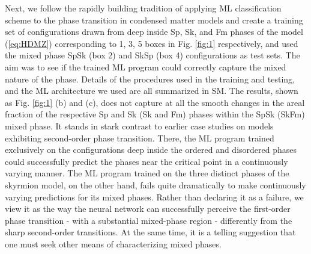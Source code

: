 \documentclass[reprint,amsmath,amssymb,aps,showpacs,superscriptaddress,prl]{revtex4-1}
\begin{document}
Next, we follow the rapidly building tradition of applying ML classification scheme to the phase transition in condensed matter models and create a training set of configurations drawn from deep inside Sp, Sk, and Fm phases of the model (\ref{eq:HDMZ}) corresponding to 1, 3, 5 boxes in Fig. \ref{fig:1} respectively, and used the mixed phase SpSk (box 2) and SkSp (box 4) configurations as test sets. The aim was to see if the trained ML program could correctly capture the mixed nature of the phase. Details of the procedures used in the training and testing, and the ML architecture we used are all summarized in SM. The results, shown as Fig. \ref{fig:1} (b) and (c), does not capture at all the smooth changes in the areal fraction of the respective Sp and Sk (Sk and Fm) phases within the SpSk (SkFm) mixed phase.
It stands in stark contrast to earlier case studies on models exhibiting second-order phase transition. There, the ML program trained exclusively on the configurations deep inside the ordered and disordered phases could successfully predict the phases near the critical point in a continuously varying manner\cite{wang16,melko17,tanaka17,scalettar17,wetzel17,kim18,zhai17,scalettar17,beach18}. The ML program trained on the three distinct phases of the skyrmion model, on the other hand, fails quite dramatically to make continuously varying predictions for its mixed phases. Rather than declaring it as a failure, we view it as the way the neural network can successfully perceive the first-order phase transition - with a substantial mixed-phase region - differently from the sharp second-order transitions. At the same time, it is a telling suggestion that one must seek other means of characterizing mixed phases.
\end{document}
